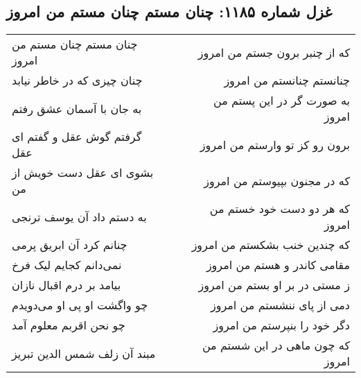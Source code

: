 \begin{center}
\section*{غزل شماره ۱۱۸۵: چنان مستم چنان مستم من امروز}
\label{sec:1185}
\begin{longtable}{l p{0.5cm} r}
چنان مستم چنان مستم من امروز
&&
که از چنبر برون جستم من امروز
\\
چنان چیزی که در خاطر نیابد
&&
چنانستم چنانستم من امروز
\\
به جان با آسمان عشق رفتم
&&
به صورت گر در این پستم من امروز
\\
گرفتم گوش عقل و گفتم ای عقل
&&
برون رو کز تو وارستم من امروز
\\
بشوی ای عقل دست خویش از من
&&
که در مجنون بپیوستم من امروز
\\
به دستم داد آن یوسف ترنجی
&&
که هر دو دست خود خستم من امروز
\\
چنانم کرد آن ابریق پرمی
&&
که چندین خنب بشکستم من امروز
\\
نمی‌دانم کجایم لیک فرخ
&&
مقامی کاندر و هستم من امروز
\\
بیامد بر درم اقبال نازان
&&
ز مستی در بر او بستم من امروز
\\
چو واگشت او پی او می‌دویدم
&&
دمی از پای ننشستم من امروز
\\
چو نحن اقربم معلوم آمد
&&
دگر خود را بنپرستم من امروز
\\
مبند آن زلف شمس الدین تبریز
&&
که چون ماهی در این شستم من امروز
\\
\end{longtable}
\end{center}

